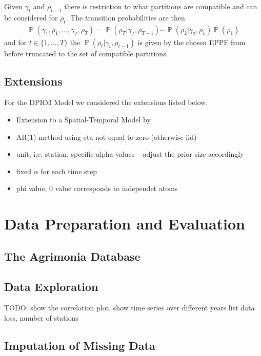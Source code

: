 \documentclass[12pt,a4paper]{article}
\DeclareMathOperator{\PP}{\mathbb{P}}
\begin{document}
Given $\gamma_t$ and $\rho_{t-1}$ there is restriction to what partitions are compatible and can be considered for $\rho_{t}$. The transition probabilities are then
\begin{align*}
    \PP(\gamma_1, \rho_1, \ldots, \gamma_T, \rho_T) = \PP(\rho_T\vert \gamma_T, \rho_{T-1})  \cdots  \PP(\rho_2\vert \gamma_2, \rho_{1}) \PP(\rho_1)
\end{align*}
and for $t \in \{1, \dots, T \}$ the $\PP(\rho_t\vert \gamma_t, \rho_{t-1})$ is given by the chosen EPPF from before truncated to the set of compatible partitions.

\subsection{Extensions}
\label{subsec:DRPMExtensions}

For the DPRM Model we considered the extensions listed below.
\begin{itemize}
    \item Extension to a Spatial-Temporal Model by 
    \item AR(1)-method using eta not equal to zero (otherwise iid)
    \item unit, i.e. station, specific alpha values -- adjust the prior size accordingly
    \item fixed $\alpha$ for each time step
    \item phi value, 0 value corresponds to independet atoms
\end{itemize}
\section{Data Preparation and Evaluation}


\subsection{The Agrimonia Database}

\subsection{Data Exploration}
TODO: show the correlation plot, show time series over different years
list data loss, number of stations

\subsection{Imputation of Missing Data}
\end{document}
